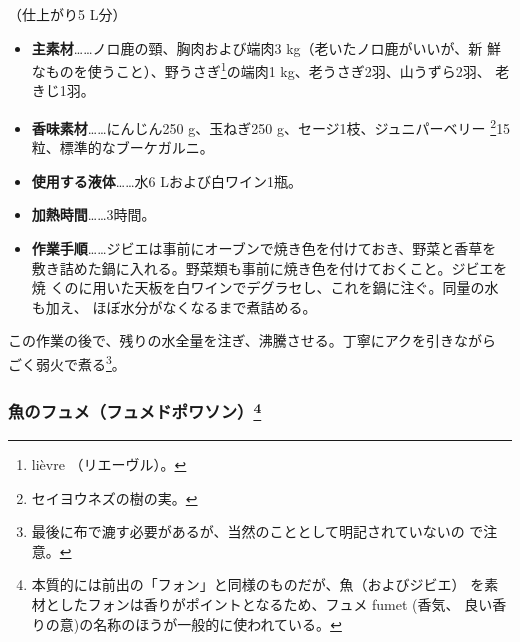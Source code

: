 \begin{recette}


（仕上がり5 L分）

\begin{itemize}
\item
  \textbf{主素材}\ldots{}\ldots{}ノロ鹿の頸、胸肉および端肉3
  kg（老いたノロ鹿がいいが、新 鮮なものを使うこと）、野うさぎ\footnote{lièvre
    （リエーヴル）。}の端肉1 kg、老うさぎ2羽、山うずら2羽、 老きじ1羽。
\item
  \textbf{香味素材}\ldots{}\ldots{}にんじん250 g、玉ねぎ250
  g、セージ1枝、ジュニパーベリー \footnote{セイヨウネズの樹の実。}15粒、標準的なブーケガルニ。
\end{itemize}

\begin{itemize}
\item
  \textbf{使用する液体}\ldots{}\ldots{}水6 Lおよび白ワイン1瓶。
\item
  \textbf{加熱時間}\ldots{}\ldots{}3時間。
\item
  \textbf{作業手順}\ldots{}\ldots{}ジビエは事前にオーブンで焼き色を付けておき、野菜と香草を
  敷き詰めた鍋に入れる。野菜類も事前に焼き色を付けておくこと。ジビエを焼
  くのに用いた天板を白ワインでデグラセし、これを鍋に注ぐ。同量の水も加え、
  ほぼ水分がなくなるまで煮詰める。
\end{itemize}

この作業の後で、残りの水全量を注ぎ、沸騰させる。丁寧にアクを引きながら
ごく弱火で煮る\footnote{最後に布で漉す必要があるが、当然のこととして明記されていないの
  で注意。}。

\hypertarget{fumet-de-poisson}{%
\subsubsection[魚のフュメ（フュメドポワソン）]{\texorpdfstring{魚のフュメ（フュメドポワソン）\footnote{本質的には前出の「フォン」と同様のものだが、魚（およびジビエ）
  を素材としたフォンは香りがポイントとなるため、フュメ fumet (香気、
  良い香りの意)の名称のほうが一般的に使われている。}}{魚のフュメ（フュメドポワソン）}}\label{fumet-de-poisson}}




\end{recette}
